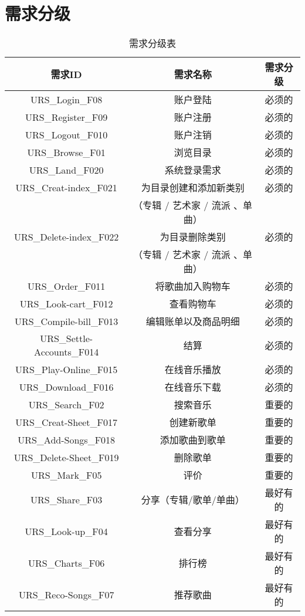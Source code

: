 \chapter{需求分级}
\begin{table}[htbp]
\centering
\caption{需求分级表} \label{tab:classification}
\begin{tabular}{|c|c|c|}
    \hline

    需求ID & 需求名称 & 需求分级 \\
    \hline
    URS\_Login\_F08  & 账户登陆 & 必须的 \\
    \hline
    URS\_Register\_F09  & 账户注册 & 必须的 \\
    \hline
    URS\_Logout\_F010  & 账户注销 & 必须的 \\
    \hline
    URS\_Browse\_F01 & 浏览目录 & 必须的 \\
    \hline
    URS\_Land\_F020 & 系统登录需求 & 必须的 \\
    \hline
    URS\_Creat-index\_F021 & 为目录创建和添加新类别 & 必须的 \\
                            &（专辑 / 艺术家 / 流派 、单曲）&\\
    \hline
    URS\_Delete-index\_F022 & 为目录删除类别 & 必须的 \\
                             &（专辑 / 艺术家 / 流派 、单曲）&\\
    \hline
    URS\_Order\_F011 & 将歌曲加入购物车 & 必须的 \\
    \hline
    URS\_Look-cart\_F012 & 查看购物车 & 必须的 \\
    \hline
    URS\_Compile-bill\_F013 & 编辑账单以及商品明细 & 必须的 \\
    \hline
    URS\_Settle-Accounts\_F014 & 结算 & 必须的 \\
    \hline
    URS\_Play-Online\_F015  & 在线音乐播放 & 必须的 \\
    \hline
    URS\_Download\_F016  & 在线音乐下载 & 必须的 \\
    \hline
    URS\_Search\_F02 & 搜索音乐 & 重要的 \\
    \hline
    URS\_Creat-Sheet\_F017 & 创建新歌单 & 重要的 \\
    \hline
    URS\_Add-Songs\_F018 & 添加歌曲到歌单 & 重要的 \\
    \hline
    URS\_Delete-Sheet\_F019 &删除歌单 & 重要的 \\
    \hline
    URS\_Mark\_F05 & 评价 & 重要的 \\
    \hline
    URS\_Share\_F03 & 分享（专辑/歌单/单曲） & 最好有的 \\
    \hline
    URS\_Look-up\_F04 & 查看分享 & 最好有的 \\
    \hline
    URS\_Charts\_F06 & 排行榜 & 最好有的 \\
    \hline
    URS\_Reco-Songs\_F07 & 推荐歌曲 & 最好有的 \\
    \hline
\end{tabular}
\end{table}

